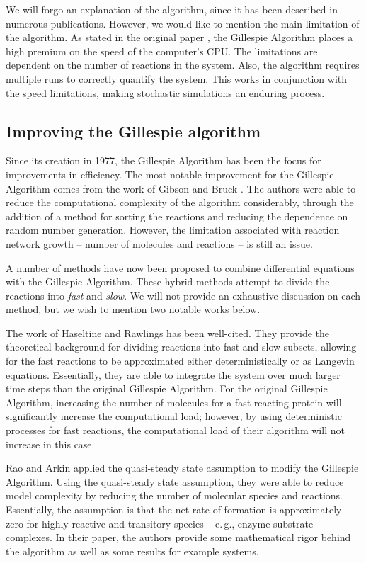 \documentclass[copyright]{eptcs}
\begin{document}
We will forgo an explanation of the algorithm, since it has been described in numerous publications.  However, we would like to mention the main limitation of the algorithm.  As stated in the original paper \cite{gillesp77}, the Gillespie Algorithm places a high premium on the speed of the computer's CPU.  The limitations are dependent on the number of reactions in the system.  Also, the algorithm requires multiple runs to correctly quantify the system.  This works in conjunction with the speed limitations, making stochastic simulations an enduring process.

\subsection{Improving the Gillespie algorithm}

Since its creation in 1977, the Gillespie Algorithm has been the focus for improvements in efficiency.  The most notable improvement for the Gillespie Algorithm comes from the work of Gibson and Bruck \cite{gibson00}.  The authors were able to reduce the computational complexity of the algorithm considerably, through the addition of a method for sorting the reactions and reducing the dependence on random number generation.  However, the limitation associated with reaction network growth -- number of molecules and reactions -- is still an issue.

A number of methods have now been proposed to combine differential equations with the Gillespie Algorithm.  These hybrid methods attempt to divide the reactions into \emph{fast} and \emph{slow}.  We will not provide an exhaustive discussion on each method, but we wish to mention two notable works below.

The work of Haseltine and Rawlings \cite{haseltine02} has been well-cited.  They provide the theoretical background for dividing reactions into fast and slow subsets, allowing for the fast reactions to be approximated either deterministically or as Langevin equations.  Essentially, they are able to integrate the system over much larger time steps than the original Gillespie Algorithm.  For the original Gillespie Algorithm, increasing the number of molecules for a fast-reacting protein will significantly increase the computational load; however, by using deterministic processes for fast reactions, the computational load of their algorithm will not increase in this case.

Rao and Arkin \cite{rao03} applied the quasi-steady state assumption to modify the Gillespie Algorithm.  Using the quasi-steady state assumption, they were able to reduce model complexity by reducing the number of molecular species and reactions.  Essentially, the assumption is that the net rate of formation is approximately zero for highly reactive and transitory species -- e.\,g., enzyme-substrate complexes.  In their paper, the authors provide some mathematical rigor behind the algorithm as well as some results for example systems.
\end{document}
